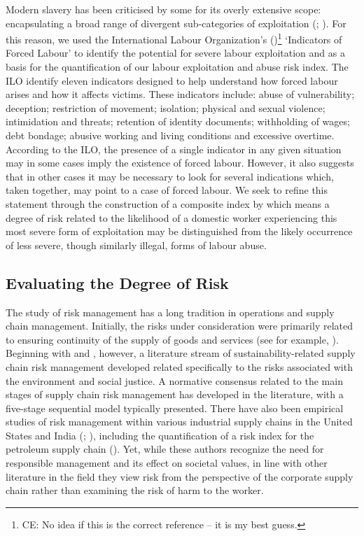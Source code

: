\documentclass[
  12pt,
  letterpaper,
  DIV=11,
  numbers=noendperiod]{scrartcl}
\begin{document}
Modern slavery has been criticised by some for its overly extensive
scope: encapsulating a broad range of divergent sub-categories of
exploitation (\textcite{oconnell_davidson_margins_2015};
\textcite{gutierrez-huerter_o_change_2023}). For this reason, we used
the International Labour Organization's
(\textcite{ILO11-indicators})\footnote{CE: No idea if this is the
  correct reference -- it is my best guess.} `Indicators of Forced
Labour' to identify the potential for severe labour exploitation and as
a basis for the quantification of our labour exploitation and abuse risk
index. The ILO identify eleven indicators designed to help understand
how forced labour arises and how it affects victims. These indicators
include: abuse of vulnerability; deception; restriction of movement;
isolation; physical and sexual violence; intimidation and threats;
retention of identity documents; withholding of wages; debt bondage;
abusive working and living conditions and excessive overtime. According
to the ILO, the presence of a single indicator in any given situation
may in some cases imply the existence of forced labour. However, it also
suggests that in other cases it may be necessary to look for several
indications which, taken together, may point to a case of forced labour.
We seek to refine this statement through the construction of a composite
index by which means a degree of risk related to the likelihood of a
domestic worker experiencing this most severe form of exploitation may
be distinguished from the likely occurrence of less severe, though
similarly illegal, forms of labour abuse.

\subsection{Evaluating the Degree of
Risk}\label{evaluating-the-degree-of-risk}

The study of risk management has a long tradition in operations and
supply chain management. Initially, the risks under consideration were
primarily related to ensuring continuity of the supply of goods and
services (see for example, \textcite{juttner_supply_2003}). Beginning
with \textcite{anderson_critical_2006} and
\textcite{anderson_sustainability_2009}, however, a literature stream of
sustainability-related supply chain risk management developed related
specifically to the risks associated with the environment and social
justice. A normative consensus related to the main stages of supply
chain risk management has developed in the literature, with a five-stage
sequential model typically presented. There have also been empirical
studies of risk management within various industrial supply chains in
the United States and India (\textcite{tarei_hybrid_2018};
\textcite{dellana_scale_2021}), including the quantification of a risk
index for the petroleum supply chain (\textcite{tarei_hybrid_2018}).
Yet, while these authors recognize the need for responsible management
and its effect on societal values, in line with other literature in the
field they view risk from the perspective of the corporate supply chain
rather than examining the risk of harm to the worker.
\end{document}

